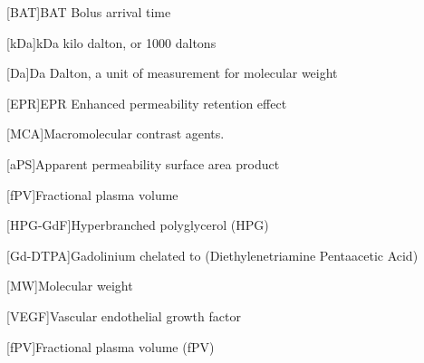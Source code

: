 \begin{acronym}
[BAT]{BAT Bolus arrival time}

[kDa]{kDa kilo dalton, or 1000 daltons}

[Da]{Da Dalton, a unit of measurement for molecular weight}

[EPR]{EPR Enhanced permeability retention effect}

[MCA]{Macromolecular contrast agents.}

[aPS]{Apparent permeability surface area product}%

[fPV]{Fractional plasma volume}

[HPG-GdF]{Hyperbranched polyglycerol (HPG)}%

[Gd-DTPA]{Gadolinium chelated to (Diethylenetriamine Pentaacetic Acid)}%

[MW]{Molecular weight}

[VEGF]{Vascular endothelial growth factor}

[fPV]{Fractional plasma volume (fPV)}


\end{acronym}
